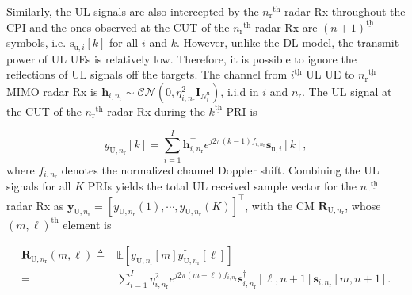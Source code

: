 \documentclass[9pt,journal]{IEEEtran}
\newcommand{\paren}[1]{\left({#1}\right)}
\newcommand{\bracket}[1]{{\left [{#1}\right ]}}
\newcommand{\ith}[1]    {{#1}^{\underline{\text{th}}}}
\newcommand{\rr}{_\mathrm{r}}
\newcommand{\duin}{\mathbf{d}_{\textrm{u},i}\bracket{k,l}}
\newcommand{\PiB}{\mathbf{P}_{\textrm{u},i}\bracket{k}}
\theoremstyle{definition}
\begin{document}
Similarly, the UL signals are also intercepted by the $\ith{n\rr}$ radar Rx throughout the CPI and the ones observed at the CUT of the $\ith{n\rr}$ radar Rx are $\ith{\paren{n+1}}$ symbols, i.e. $\mathrm{s}_{\textrm{u},i}\bracket{k}$ for all $i$ and $k$. 
However, unlike the DL model, the transmit power of UL UEs is relatively low. Therefore, it is possible to ignore the reflections of UL signals off the targets. The channel from $\ith{i}$ UL UE to $\ith{n\rr}$ MIMO radar Rx is $\mathbf{h}_{i,n\rr}\sim\mathcal{CN}\paren{0,\eta^2_{i,n\rr}\mathbf{I}_{\mathit{N}^{\textrm{u}}_i}}$, i.i.d in $i$ and $n\rr$. 
The UL signal at the CUT of the $\ith{n\rr}$ radar Rx during the $\ith{k}$ PRI is \par\noindent\small
\begin{equation}
y_{\textrm{U},n\rr}\bracket{k}=\sum_{i=1}^{\mathit{I}}\mathbf{h}^\top_{i,n\rr}e^{j2\pi(k-1) f_{i,n_\mathrm{r}}}\mathbf{s}_{\textrm{u},i}\bracket{k},\label{eq:UL1}
\end{equation}\normalsize
where $f_{i,n_\mathrm{r}}$ denotes the normalized channel Doppler shift. Combining the UL signals for all $\mathit{K}$ PRIs yields the total UL received sample vector for the $\ith{n\rr}$ radar Rx as  $\mathbf{y}_{\mathrm{U},n\rr}=\bracket{y_{\textrm{U},n\rr}\paren{1},\cdots,y_{\textrm{U},n\rr}\paren{\mathit{K}}}^\top$, with the CM $\mathbf{R}_{\mathrm{U},n\rr}$, whose
$\ith{\paren{m,\ell}}$ element %
is  \par\noindent\small
\begin{align}
\mathbf{R}_{\mathrm{U},n\rr}\paren{m,\ell}\triangleq&\mathbb{E}\bracket{y_{\mathrm{U},n\rr}\bracket{m}y^\dagger_{\mathrm{U},n\rr}\bracket{\ell}}\nonumber\\
=&\sum_{i=1}^{\mathit{I}}\eta^2_{i,n\rr}e^{j2\pi\paren{m-\ell}f_{i,n\rr}}\mathbf{s}^\dagger_{i,n\rr}\bracket{\ell,n+1}\mathbf{s}_{i,n\rr}\bracket{m,n+1}.\nonumber
\end{align}\normalsize
\end{document}
